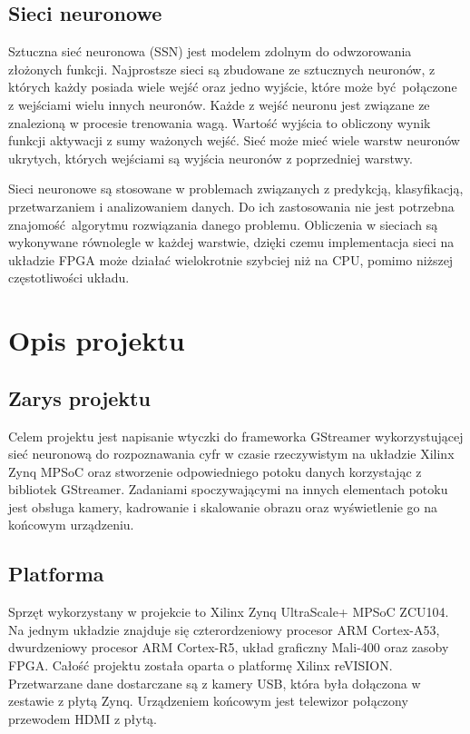 \documentclass[12pt, oneside]{article}
\begin{document}
\subsection{Sieci neuronowe}
Sztuczna sieć neuronowa (SSN) jest modelem zdolnym do odwzorowania złożonych
funkcji. Najprostsze sieci są zbudowane ze sztucznych neuronów, z których każdy
posiada wiele wejść oraz jedno wyjście, które może być połączone z wejściami
wielu innych neuronów. Każde z wejść neuronu jest związane ze znalezioną
w procesie trenowania wagą. Wartość wyjścia to obliczony wynik funkcji aktywacji
z sumy ważonych wejść. Sieć może mieć wiele warstw neuronów ukrytych, których
wejściami są wyjścia neuronów z poprzedniej warstwy. 

Sieci neuronowe są stosowane  w problemach
związanych z predykcją, klasyfikacją, przetwarzaniem i analizowaniem
danych. Do ich zastosowania nie jest potrzebna znajomość algorytmu rozwiązania
danego problemu. Obliczenia w sieciach są wykonywane równolegle w każdej
warstwie, dzięki czemu implementacja sieci na układzie FPGA może działać
wielokrotnie szybciej niż na CPU, pomimo niższej częstotliwości układu.

\newpage
\section{Opis projektu}

\subsection{Zarys projektu}
Celem projektu jest napisanie wtyczki do frameworka GStreamer
wykorzystującej sieć neuronową do rozpoznawania cyfr w czasie rzeczywistym 
na układzie Xilinx Zynq MPSoC oraz stworzenie odpowiedniego potoku danych
korzystając z bibliotek GStreamer. Zadaniami spoczywającymi na innych
elementach potoku jest obsługa kamery,
kadrowanie i skalowanie obrazu oraz wyświetlenie go na końcowym urządzeniu.

\subsection{Platforma}
Sprzęt wykorzystany w projekcie to Xilinx Zynq UltraScale+ MPSoC ZCU104.
Na jednym układzie znajduje się czterordzeniowy procesor
ARM \mbox{Cortex-A53},
dwurdzeniowy procesor ARM \mbox{Cortex-R5},
układ graficzny \mbox{Mali-400} oraz zasoby FPGA.
Całość projektu została oparta o platformę Xilinx reVISION. Przetwarzane
dane dostarczane są z kamery USB, która była dołączona w zestawie z płytą Zynq.
Urządzeniem końcowym jest telewizor połączony przewodem HDMI z płytą.
\end{document}
